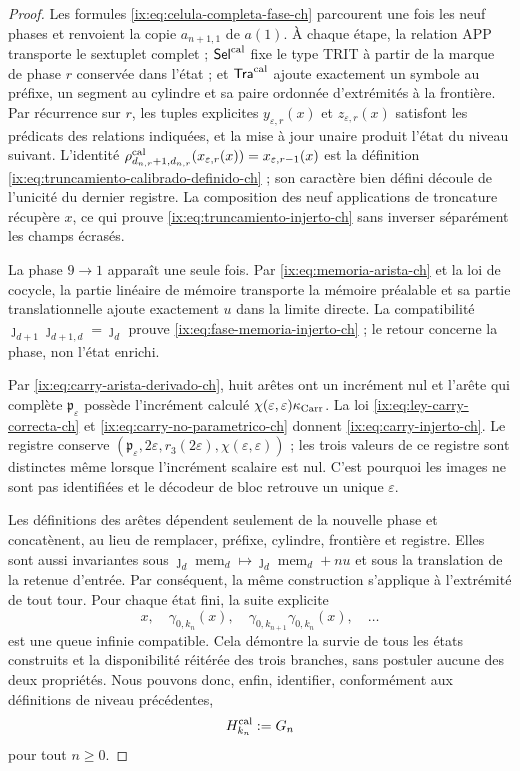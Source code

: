 \begin{proof}
Les formules \eqref{ix:eq:celula-completa-fase-ch} parcourent une fois les neuf phases et renvoient la copie \(a_{n+1,1}\) de \(a(1)\). À chaque étape, la relation APP transporte le sextuplet complet ; \(\mathsf{Sel}^{\rm cal}\) fixe le type TRIT à partir de la marque de phase \(r\) conservée dans l'état ; et \(\mathsf{Tra}^{\rm cal}\) ajoute exactement un symbole au préfixe, un segment au cylindre et sa paire ordonnée d'extrémités à la frontière. Par récurrence sur \(r\), les tuples explicites \(y_{\varepsilon,r}(x)\) et \(z_{\varepsilon,r}(x)\) satisfont les prédicats des relations indiquées, et la mise à jour unaire produit l'état du niveau suivant. L'identité \(\rho^{\rm cal}_{d_{n,r}+1,d_{n,r}}
(x_{\varepsilon,r}(x))=x_{\varepsilon,r-1}(x)\) est la définition \eqref{ix:eq:truncamiento-calibrado-definido-ch} ; son caractère bien défini découle de l'unicité du dernier registre. La composition des neuf applications de troncature récupère \(x\), ce qui prouve \eqref{ix:eq:truncamiento-injerto-ch} sans inverser séparément les champs écrasés.

La phase \(9\to1\) apparaît une seule fois. Par
\eqref{ix:eq:memoria-arista-ch} et la loi de cocycle, la partie linéaire de mémoire
transporte la mémoire préalable et sa partie translationnelle ajoute exactement \(u\)
dans la limite directe. La compatibilité
\(\jmath_{d+1}\jmath_{d+1,d}=\jmath_d\) prouve
\eqref{ix:eq:fase-memoria-injerto-ch} ; le retour concerne la phase, non
l’état enrichi.

Par \eqref{ix:eq:carry-arista-derivado-ch}, huit arêtes ont un incrément nul et
l’arête qui complète \(\mathfrak p_\varepsilon\) possède l’incrément calculé
\(\chi(\varepsilon,\varepsilon)\kappa_{\rm Carr}\). La loi
\eqref{ix:eq:ley-carry-correcta-ch} et
\eqref{ix:eq:carry-no-parametrico-ch} donnent
\eqref{ix:eq:carry-injerto-ch}. Le registre conserve
\((\mathfrak p_\varepsilon,2\varepsilon,r_3(2\varepsilon),
\chi(\varepsilon,\varepsilon))\) ; les trois valeurs de ce registre sont
distinctes même lorsque l’incrément scalaire est nul. C’est pourquoi les images
ne sont pas identifiées et le décodeur de bloc retrouve un unique
\(\varepsilon\).

Les définitions des arêtes dépendent seulement de la nouvelle phase et concatènent,
au lieu de remplacer, préfixe, cylindre, frontière et registre. Elles sont aussi
invariantes sous
\(\jmath_d\operatorname{mem}_d\mapsto
  \jmath_d\operatorname{mem}_d+nu\)
et sous la translation de la retenue
d’entrée. Par conséquent, la même construction s’applique à l’extrémité de
tout tour. Pour chaque état fini, la suite explicite
\[
 x,\quad\gamma_{0,k_n}(x),\quad
 \gamma_{0,k_{n+1}}\gamma_{0,k_n}(x),\quad\ldots
\]
est une queue infinie compatible. Cela démontre la survie de tous les
états construits et la disponibilité réitérée des trois branches, sans
postuler aucune des deux propriétés. Nous pouvons donc, enfin,
identifier, conformément aux définitions de niveau précédentes,
\begin{equation}
 H_{k_n}^{\rm cal}:=G_n
 \label{ix:eq:subarbol-calibrado-superviviente-ch}
\end{equation}
pour tout \(n\ge0\).
\end{proof}

